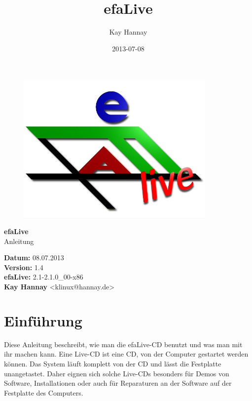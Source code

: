 \documentclass[a4paper,12pt,twoside]{article}
\title{efaLive}
\author{Kay Hannay}
\date{2013-07-08}
\begin{document}

\begin{titlepage}
    \vspace*{1cm}
    \begin{center}
        \begin{figure}
            \centering
            \includegraphics[width=9.745cm,height=7.308cm]{efaLivede-img/efaLivede-img1.png}
        \end{figure}
        \Huge
        {\bf efaLive} \\[0.1cm]
        \LARGE
        Anleitung \\[5cm]
    \end{center}
    \normalsize
    {\bf Datum:} 08.07.2013 \\
    {\bf Version:} 1.4 \\
    {\bf efaLive:} 2.1-2.1.0\_00-x86 \\
    {\bf Kay Hannay} <klinux@hannay.de> \\
\end{titlepage}


\tableofcontents
\clearpage\setcounter{page}{1}
\section{Einführung}
Diese Anleitung beschreibt, wie man die efaLive-CD benutzt und was man
mit ihr machen kann. Eine Live-CD ist eine CD, von der Computer
gestartet werden können. Das System läuft komplett von der CD und lässt
die Festplatte unangetastet. Daher eignen sich solche Live-CDs
besonders für Demos von Software, Installationen oder auch für
Reparaturen an der Software auf der Festplatte des Computers.
\end{document}
